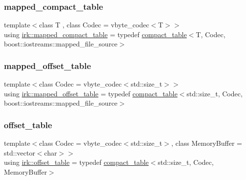 \mbox{\label{namespaceirk_a355b82a658f8685da29eca82444fed3c}} 
\subsubsection{\texorpdfstring{mapped\+\_\+compact\+\_\+table}{mapped\_compact\_table}}
{\footnotesize\ttfamily template$<$class T , class Codec  = vbyte\+\_\+codec$<$\+T$>$$>$ \\
using \mbox{\hyperlink{namespaceirk_a355b82a658f8685da29eca82444fed3c}{irk\+::mapped\+\_\+compact\+\_\+table}} = typedef \mbox{\hyperlink{classirk_1_1compact__table}{compact\+\_\+table}}$<$T, Codec, boost\+::iostreams\+::mapped\+\_\+file\+\_\+source$>$}

\mbox{\label{namespaceirk_ab3084e78181e92fe4bea7332e0a77e98}} 
\subsubsection{\texorpdfstring{mapped\+\_\+offset\+\_\+table}{mapped\_offset\_table}}
{\footnotesize\ttfamily template$<$class Codec  = vbyte\+\_\+codec$<$std\+::size\+\_\+t$>$$>$ \\
using \mbox{\hyperlink{namespaceirk_ab3084e78181e92fe4bea7332e0a77e98}{irk\+::mapped\+\_\+offset\+\_\+table}} = typedef \mbox{\hyperlink{classirk_1_1compact__table}{compact\+\_\+table}}$<$std\+::size\+\_\+t, Codec, boost\+::iostreams\+::mapped\+\_\+file\+\_\+source$>$}

\mbox{\label{namespaceirk_a3d7b00f359d122e0bf0f709d21f00098}} 
\subsubsection{\texorpdfstring{offset\+\_\+table}{offset\_table}}
{\footnotesize\ttfamily template$<$class Codec  = vbyte\+\_\+codec$<$std\+::size\+\_\+t$>$, class Memory\+Buffer  = std\+::vector$<$char$>$$>$ \\
using \mbox{\hyperlink{namespaceirk_a3d7b00f359d122e0bf0f709d21f00098}{irk\+::offset\+\_\+table}} = typedef \mbox{\hyperlink{classirk_1_1compact__table}{compact\+\_\+table}}$<$std\+::size\+\_\+t, Codec, Memory\+Buffer$>$}

